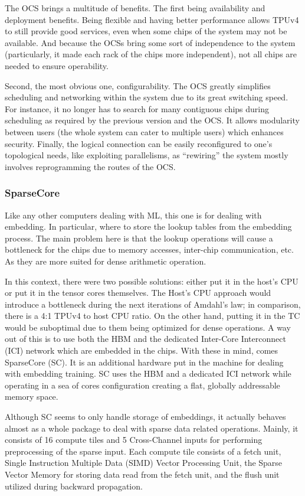 The OCS brings a multitude of benefits.
The first being availability and deployment benefits.
Being flexible and having better performance allows TPUv4 to still provide good services, even when some chips of the system may not be available.
And because the OCSs bring some sort of independence to the system (particularly, it made each rack of the chips more independent), not all chips are needed to ensure operability.

Second, the most obvious one, configurability.
The OCS greatly simplifies scheduling and networking within the system due to its great switching speed.
For instance, it no longer has to search for many contiguous chips during scheduling as required by the previous version and the OCS. It allows modularity between users (the whole system can cater to multiple users) which enhances security.
Finally, the logical connection can be easily reconfigured to one's topological needs, like exploiting parallelisms, as ``rewiring'' the system mostly involves reprogramming the routes of the OCS\@.

\subsubsection{SparseCore}
Like any other computers dealing with ML, this one is for dealing with embedding.
In particular, where to store the lookup tables from the embedding process.
The main problem here is that the lookup operations will cause a bottleneck for the chips due to memory accesses, inter-chip communication, etc.
As they are more suited for dense arithmetic operation.

In this context, there were two possible solutions: either put it in the host’s CPU or put it in the tensor cores themselves.
The Host’s CPU approach would introduce a bottleneck during the next iterations of Amdahl’s law; in comparison, there is a 4:1 TPUv4 to host CPU ratio.
On the other hand, putting it in the TC would be suboptimal due to them being optimized for dense operations.
A way out of this is to use both the HBM and the dedicated Inter-Core Interconnect (ICI) network which are embedded in the chips.
With these in mind, comes SparseCore (SC).
It is an additional hardware put in the machine for dealing with embedding training.
SC uses the HBM and a dedicated ICI network while operating in a sea of cores configuration creating a flat, globally addressable memory space.

Although SC seems to only handle storage of embeddings, it actually behaves almost as a whole package to deal with sparse data related operations.
Mainly, it consists of 16 compute tiles and 5 Cross-Channel inputs for performing preprocessing of the sparse input.
Each compute tile consists of a fetch unit, Single Instruction Multiple Data (SIMD) Vector Processing Unit, the Sparse Vector Memory for storing data read from the fetch unit, and the flush unit utilized during backward propagation.


